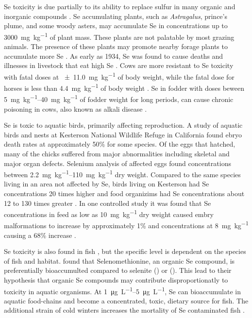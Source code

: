 \begin{linenumbers}[1]
Se toxicity is due partially to its ability to replace sulfur in many organic and inorganic compounds \parencite{Besser1989}.  Se accumulating plants, such as \textit{Astragalus}, prince's plume, and some woody asters, may accumulate Se in concentrations up to \SI{3000}{\milli\gram\per\kilo\gram} of plant mass.  These plants are not palatable by most grazing animals.  The presence of these plants may promote nearby forage plants to accumulate more Se \parencite{2006USDA}.  As early as 1934, Se was found to cause deaths and illnesses in livestock that eat high Se \parencite{scott1973,Rohwer1931,Besser1989,2006USDA}.  Cows are more resistant to Se toxicity with fatal doses at \SI{\pm11.0}{\milli\gram\per\kilo\gram} of body weight, while the fatal dose for horses is less than \SI{4.4}{\milli\gram\per\kilo\gram} of body weight \parencite{Painter1940}.  Se in fodder with doses beween \SIrange{5}{40}{\milli\gram\per\kilo\gram} of fodder weight for long periods, can cause chronic poisoning in cows, also known as alkali disease \parencite{2006USDA}.

Se is toxic to aquatic birds, primarily affecting reproduction.  A study of aquatic birds and nests at Kesterson National Wildlife Refuge in California found ebryo death rates at approximately 50\% for some species.  Of the eggs that hatched, many of the chicks suffered from major abnormalities including skeletal and major organ defects.  Selenium analysis of affected eggs found concentrations between \SIrange{2.2}{110}{\milli\gram\per\kilo\gram} dry weight.  Compared to the same species living in an area not affected by Se, birds living on Kesterson had Se concentrations 20 times higher and food organizims had Se concentrations about 12 to 130 times greater \parencite{Ohlendorf1986}.  In one controlled study it was found that Se concentrations in feed as low as \SI{10}{\milli\gram\per\kilo\gram} dry weight caused embry malformations to increase by approximately 1\% and concentrations at  \SI{8}{\milli\gram\per\kilo\gram} causing a 68\% increase \parencite{2002Spallholz}.

Se toxicity is also found in fish \parencite{gillespie1986,Lemly1988}, but the specific level is dependent on the species of fish and habitat.  \textcite{Besser1989} found that Selenomethionine, an organic Se compound, is preferentially bioaccumulted compared to selenite (\selenite) or  (\selenate).  This lead to their hypothesis that organic Se compounds may contribute disproportionatly to toxicity in aquatic organisms.  At \SIrange{1}{5}{\micro\gram\per\liter}, Se can bioaccumulate in aquatic food-chains and become a concentrated, toxic, dietary source for fish.  The additional strain of cold winters increases the mortality of Se contaminated fish \parencite{Lemly1993}.  


\end{linenumbers}
